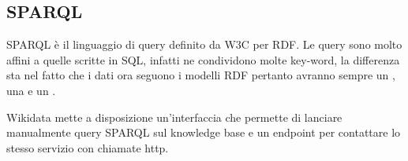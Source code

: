 \subsection{SPARQL}
SPARQL è il linguaggio di query definito da W3C per RDF. Le query sono molto affini a quelle scritte in SQL, infatti ne condividono molte key-word, la differenza sta nel fatto che i dati ora 
seguono i modelli RDF pertanto avranno sempre un , una  e un .

Wikidata mette a disposizione un'interfaccia\cite{sparql-ui} che permette di lanciare manualmente query SPARQL sul knowledge base
e un endpoint\cite{sparql-endpoint} per contattare lo stesso servizio con chiamate http. 
